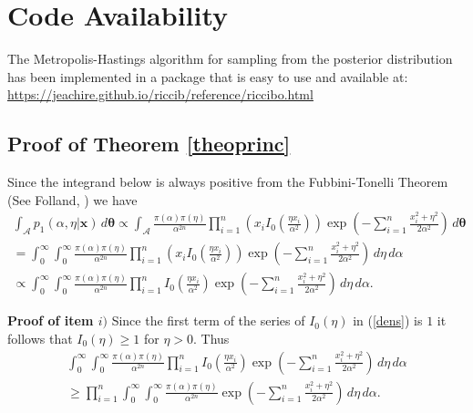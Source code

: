 \documentclass[12pt]{interact}
\theoremstyle{plain}%
\theoremstyle{definition}
\theoremstyle{remark}
\begin{document}
\section*{Code Availability}

The Metropolis-Hastings algorithm for sampling from the posterior distribution has been implemented in a package that is easy to use and available at: \\ \url{https://jeachire.github.io/riccib/reference/riccibo.html}

\newpage






\begin{appendix}    

\section{Proof of Theorem \ref{theoprinc}}

Since the integrand below is always positive from the Fubbini-Tonelli Theorem (See Folland, \cite{folland}) we have
\begin{equation*}
\begin{aligned}
\int_{\mathcal{A}} p_1(\alpha,\eta|\boldsymbol{x})\, d\boldsymbol{\theta} \propto \int_{\mathcal{A}} 
 \frac{\pi(\alpha)\pi(\eta)}{ \alpha^{2n}}\prod_{i=1}^{n}\left(x_iI_0\left( \frac{\eta x_i}{\alpha^2} \right)\right) \exp\left( -\sum_{i=1}^{n}\frac{x_i^2 + \eta^2}{2\alpha^2} \right)\, d\boldsymbol{\theta}\\
= \int_0^\infty \int_0^\infty\frac{\pi(\alpha)\pi(\eta)}{\alpha^{2n}}\prod_{i=1}^{n}\left(x_iI_0\left( \frac{\eta x_i}{\alpha^2} \right)\right) \exp\left( -\sum_{i=1}^{n}\frac{x_i^2 + \eta^2}{2\alpha^2} \right)\, d\eta\, d\alpha\\
\propto \int_0^\infty \int_0^\infty\frac{\pi(\alpha)\pi(\eta)}{\alpha^{2n}}\prod_{i=1}^{n}I_0\left( \frac{\eta x_i}{\alpha^2} \right) \exp\left( -\sum_{i=1}^{n}\frac{x_i^2 + \eta^2}{2\alpha^2} \right)\, d\eta\, d\alpha.
\end{aligned}
\end{equation*}

\noindent\textbf{Proof of item $i)$} Since the first term of the series of $I_0(\eta)$ in (\ref{dens}) is $1$ it follows that $I_0(\eta) \geq 1$ for $\eta>0$. Thus
\begin{equation*}
\begin{aligned}
\int_0^\infty \int_0^\infty\frac{\pi(\alpha)\pi(\eta)}{\alpha^{2n}}\prod_{i=1}^{n}I_0\left( \frac{\eta x_i}{\alpha^2} \right) \exp\left( -\sum_{i=1}^{n}\frac{x_i^2 + \eta^2}{2\alpha^2} \right)\, d\eta\, d\alpha\\
\geq \prod_{i=1}^{n}\int_0^\infty 
 \int_0^\infty\frac{\pi(\alpha)\pi(\eta)}{ \alpha^{2n}}\exp\left( -\sum_{i=1}^{n}\frac{x_i^2 + \eta^2}{2\alpha^2} \right)\, d\eta \, d\alpha.
\end{aligned}
\end{equation*}


\end{appendix}
\end{document}
